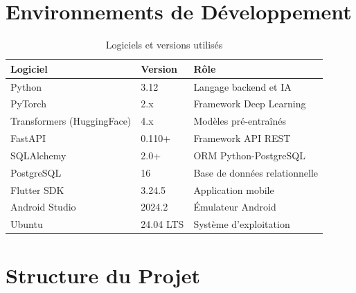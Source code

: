 \documentclass[12pt,a4paper,oneside]{report}
\begin{document}
\section{Environnements de Développement}

\begin{table}[H]
\centering
\caption{Logiciels et versions utilisés}
\label{tab:software}
\renewcommand{\arraystretch}{1.4}
\begin{tabular}{lll}
\toprule
\rowcolor{bleuprincipal!15}
\textbf{Logiciel} & \textbf{Version} & \textbf{Rôle} \\
\midrule
Python & 3.12 & Langage backend et IA \\
\rowcolor{gray!8}
PyTorch & 2.x & Framework Deep Learning \\
Transformers (HuggingFace) & 4.x & Modèles pré-entraînés \\
\rowcolor{gray!8}
FastAPI & 0.110+ & Framework API REST \\
SQLAlchemy & 2.0+ & ORM Python-PostgreSQL \\
\rowcolor{gray!8}
PostgreSQL & 16 & Base de données relationnelle \\
Flutter SDK & 3.24.5 & Application mobile \\
\rowcolor{gray!8}
Android Studio & 2024.2 & Émulateur Android \\
Ubuntu & 24.04 LTS & Système d'exploitation \\
\bottomrule
\end{tabular}
\end{table}

\section{Structure du Projet}
\end{document}
